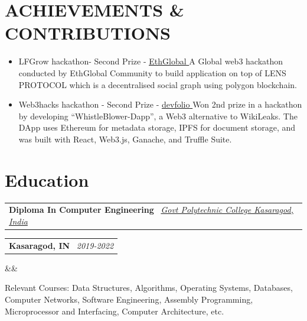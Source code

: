 \documentclass[11pt,a4paper,sans]{moderncv}
\makeatletter
\newcommand*{\customcventry}[7][0.13em]{
  \begin{tabular}{@{}l}
    {\bfseries #4} \
    {\itshape #3}
  \end{tabular}
  \hfill
  \begin{tabular}{l@{}}
    {\bfseries #5} \
    {\itshape #2}
  \end{tabular}
  \ifx&#7&
  \else{\
    \begin{minipage}{\maincolumnwidth}
      \small#7
  \end{minipage}}\fi
  \par\addvspace{#1}
}
\makeatother
\begin{document}
\section{ACHIEVEMENTS \& CONTRIBUTIONS}
{
  \begin{itemize}[label=\textbullet]
    \item LFGrow hackathon- Second Prize -
      \underline{
        \color{blue}\href{https://ethglobal.com/showcase/zilly-b3y8b}{EthGlobal}
      }
      \newline A Global web3 hackathon conducted by EthGlobal Community to
      build application on top of LENS PROTOCOL which is a
      decentralised social graph using polygon blockchain.

    \item Web3hacks hackathon - Second Prize -
      \underline{
        \color{blue}
        \href{https://devfolio.co/projects/whistleblower-c8a5}{devfolio}
      }
      \newline Won 2nd prize in a hackathon by developing
      “WhistleBlower-Dapp”, a Web3
      alternative to WikiLeaks. The DApp uses Ethereum for metadata
      storage, IPFS for
      document storage, and was built with React, Web3.js, Ganache,
      and Truffle Suite.


  \end{itemize}
}

\section{Education}
\customcventry{2019-2022}
{\color{blue}\href{https://gpckasaragod.ac.in/} {Govt Polytechnic
College Kasaragod, India}}
{Diploma In Computer Engineering}{Kasaragod, IN}{}{}
{Relevant Courses:
  Data Structures, Algorithms, Operating Systems, Databases, Computer Networks,
  Software Engineering, Assembly Programming, Microprocessor and Interfacing,
Computer Architecture, etc.}
\end{document}
